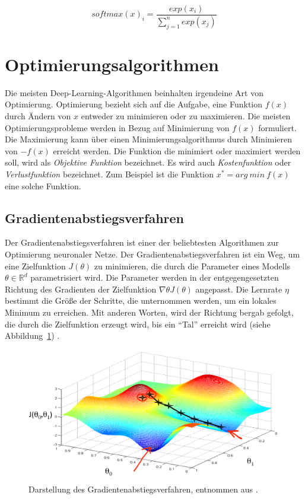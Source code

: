 \begin{equation} \label{FormelSoft}
    softmax( x)_{i} =\frac{exp( x_{i})}{\sum ^{n}_{j=1} exp( x_{j})}
\end{equation}

\section{Optimierungsalgorithmen}
Die meisten Deep-Learning-Algorithmen beinhalten irgendeine Art von Optimierung. Optimierung bezieht sich auf die Aufgabe, eine Funktion $f(x)$ durch Ändern von $x$ entweder zu minimieren oder zu maximieren. Die meisten Optimierungsprobleme werden in Bezug auf Minimierung von $f(x)$ formuliert. Die Maximierung kann über einen Minimierungsalgorithmus durch Minimieren von $-$$f(x)$ erreicht werden. Die Funktion die minimiert oder maximiert werden soll, wird als \textit{Objektive Funktion} bezeichnet. Es wird auch \textit{Kostenfunktion} oder \textit{Verlustfunktion} bezeichnet. Zum Beispiel ist die Funktion $x^{*} = arg\ min\ f( x)$ eine solche Funktion.

\subsection{Gradientenabstiegsverfahren}
Der Gradientenabstiegsverfahren ist einer der beliebtesten Algorithmen zur Optimierung neuronaler Netze. Der Gradientenabstiegsverfahren ist ein Weg, um eine Zielfunktion $J(\theta)$ zu minimieren, die durch die Parameter eines Modells $\theta \in \mathbb{R}^{d}$ parametrisiert wird. Die Parameter werden in der entgegengesetzten Richtung des Gradienten der Zielfunktion $\nabla \theta J (\theta)$ angepasst. Die Lernrate $\eta$ bestimmt die Größe der Schritte, die unternommen werden, um ein lokales Minimum zu erreichen. Mit anderen Worten, wird der Richtung bergab gefolgt, die durch die Zielfunktion erzeugt wird, bis ein \enquote{Tal} erreicht wird (siehe Abbildung~\ref{Kap2:Grad}) \cite*{Ruder2016}.



\begin{figure}[H]
    \centering
    \includegraphics[width=12cm]{kapitel2/gradient.png}
    \caption[Der Gradientenabstiegsverfahren]{Darstellung des Gradientenabstiegsverfahren, entnommen aus \cite*{hackernoon}.}
    \label{Kap2:Grad}
\end{figure}



